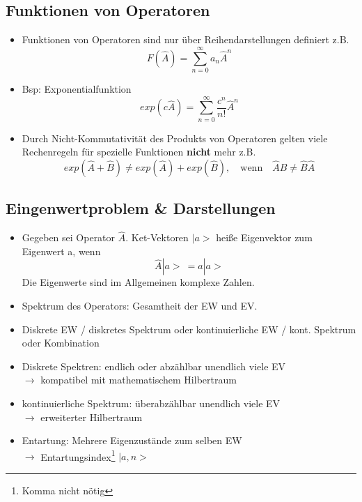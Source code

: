 \documentclass[10pt,article,colorback,accentcolor=tud9d]{scrartcl}
\begin{document}
\begin{fleqn}
\subsection{Funktionen von Operatoren}
\begin{itemize}
  \item Funktionen von Operatoren sind nur über Reihendarstellungen definiert z.B.
    \begin{equation}
    F(\hat{A})=\sum^\infty_{n=0}a_n\hat{A}^n
    \end{equation}
  \item Bsp: Exponentialfunktion
    \begin{equation}
    exp(c\hat{A})= \sum^\infty_{n=0}\frac{c^n}{n!}\hat{A}^n
    \end{equation}
  \item Durch Nicht-Kommutativität des Produkts von Operatoren gelten viele Rechenregeln für spezielle Funktionen \textbf{nicht} mehr z.B.
  \begin{equation}
  exp(\hat{A}+\hat{B})\neq exp(\hat{A}) +exp(\hat{B}), \quad \text{wenn} \quad \hat{A}\hat{B} \neq \hat{B}\hat{A}
  \end{equation}
\end{itemize}
\subsection{Eingenwertproblem \& Darstellungen}
\begin{itemize}
  \item Gegeben sei Operator $\hat{A}$. Ket-Vektoren $\left.\right|a>$ heiße Eigenvektor zum Eigenwert a, wenn
    \begin{equation}
    \hat{A}\left.\right|a> \ = a\left.\right|a>
    \end{equation}
    \textcolor[rgb]{1,0,0}{Die Eigenwerte sind im Allgemeinen komplexe Zahlen.}
  \item Spektrum des Operators: Gesamtheit der EW und EV.
  \item Diskrete EW / diskretes Spektrum oder kontinuierliche EW / kont. Spektrum oder Kombination
  \item Diskrete Spektren: endlich oder abzählbar unendlich viele EV\\
    $\rightarrow$ kompatibel mit mathematischem Hilbertraum
  \item kontinuierliche Spektrum: überabzählbar unendlich viele EV\\
    $\rightarrow$ erweiterter Hilbertraum
  \item Entartung: Mehrere Eigenzustände zum selben EW\\
    $\rightarrow$ Entartungsindex\footnote{Komma nicht nötig} $\left.\right|a,n>$
\end{itemize}

\end{fleqn}
\end{document}
